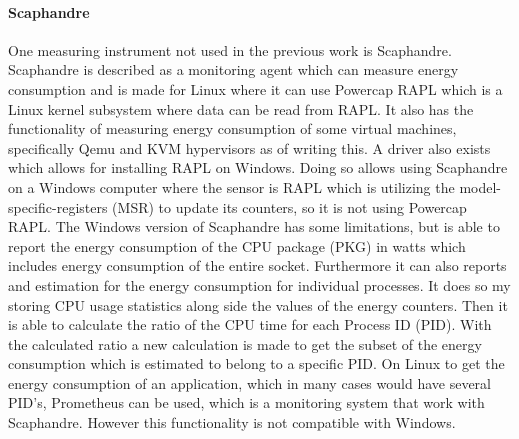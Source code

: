 \paragraph{Scaphandre}
One measuring instrument not used in the previous work is Scaphandre\cite{scaphandre}. Scaphandre is described as a monitoring agent which can measure energy consumption and is made for Linux where it can use Powercap RAPL which is a Linux kernel subsystem where data can be read from RAPL. It also has the functionality of measuring energy consumption of some virtual machines, specifically Qemu and KVM hypervisors as of writing this. A driver also exists which allows for installing RAPL on Windows.\cite{RAPL_Windows} Doing so allows using Scaphandre on a Windows computer where the sensor is RAPL which is utilizing the model-specific-registers (MSR) to update its counters, so it is not using Powercap RAPL. The Windows version of Scaphandre has some limitations, but is able to report the energy consumption of the CPU package (PKG) in watts which includes energy consumption of the entire socket. Furthermore it can also reports and estimation for the energy consumption for individual processes. It does so my storing CPU usage statistics along side the values of the energy counters. Then it is able to calculate the ratio of the CPU time for each Process ID (PID). With the calculated ratio a new calculation is made to get the subset of the energy consumption which is estimated to belong to a specific PID. On Linux to get the energy consumption of an application, which in many cases would have several PID's, Prometheus can be used, which is a monitoring system that work with Scaphandre. However this functionality is not compatible with Windows.
